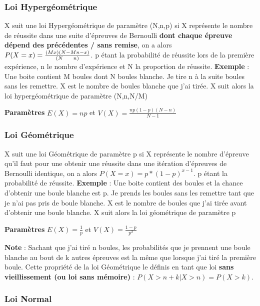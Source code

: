 \documentclass[a4paper]{article}
\begin{document}
\subsubsection{Loi Hypergéométrique}
X suit une loi Hypergéométrique de paramètre (N,n,p) si X représente le nombre de réussite dans une suite d'épreuves de Bernoulli \textbf{dont chaque épreuve dépend des précédentes / sans remise}, on a alors $P(X=x)=\frac{\left(M \\ x \right) \left(N - M \\ n - x \right)}{\left(N \\ n \right)} $. p étant la probabilité de réussite lors de la première expérience, n le nombre d'expérience et N la proportion de réussite.\newline
\textbf{Exemple} : Une boite contient M boules dont N boules blanche. Je tire n à la suite boules sans les remettre. X est le nombre de boules blanche que j'ai tirée. X suit alors la loi hypergéométrique de paramètre (N,n,N/M) \newline

\textbf{Paramètres}
$E(X) = np$ et $ V(X)=\frac{np(1-p)(N-n)}{N-1}$
\subsubsection{Loi Géométrique}
X suit une loi Géométrique de paramètre p si X représente le nombre d'épreuve qu'il faut pour une obtenir une réussite dans une itération d'épreuves de Bernoulli identique, on a alors $P(X=x)=p * (1-p)^{x-1} $. p étant la probabilité de réussite.\newline
\textbf{Exemple} : Une boite contient des boules et la chance d'obtenir une boule blanche est p. Je prends les boules sans les remettre tant que je n'ai pas pris de boule blanche. X est le nombre de boules que j'ai tirée avant d'obtenir une boule blanche. X suit alors la loi géométrique de paramètre p \newline

\textbf{Paramètres}
$E(X) = \frac{1}{p}$ et $ V(X)=\frac{1-p}{p^2}$

\textbf{Note} : Sachant que j'ai tiré n boules, les probabilités que je prennent une boule blanche au bout de k autres épreuves est la même que lorsque j'ai tiré la première boule. Cette propriété de la loi Géométrique le définis en tant que loi \textbf{sans vieillissement (ou loi sans mémoire)} : $P(X> n + k | X>n) = P(X>k)$.
\subsubsection{Loi Normal}
\end{document}
